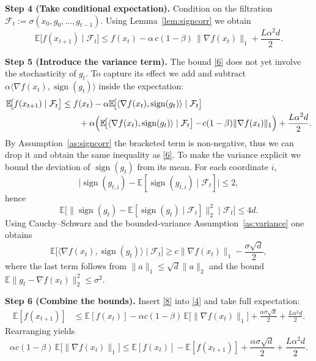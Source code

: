\documentclass{article}
\begin{document}
\noindent\textbf{Step 4 (Take conditional expectation).}  
Condition on the filtration $\mathcal{F}_{t}:=\sigma(x_{0},g_{0},\dots,g_{t-1})$.
Using Lemma~\ref{lem:signcorr} we obtain
\[
\mathbb{E}\!\bigl[f(x_{t+1})\mid\mathcal{F}_{t}\bigr]
\le f(x_{t})-\alpha\,c(1-\beta)\,\|\nabla f(x_{t})\|_{1}
+\frac{L\alpha^{2}d}{2}.
\tag{6}
\]

\noindent\textbf{Step 5 (Introduce the variance term).}  
The bound \eqref{6} does not yet involve the stochasticity of $g_{t}$. To capture its effect we add and subtract $\alpha\langle\nabla f(x_{t}),\operatorname{sign}(g_{t})\rangle$ inside the expectation:
\begin{align*}
\mathbb{E}\!\bigl[f(x_{t+1})\mid\mathcal{F}_{t}\bigr]
&\le f(x_{t})-\alpha\mathbb{E}\!\bigl[\langle\nabla f(x_{t}),\operatorname{sign}(g_{t})\rangle\mid\mathcal{F}_{t}\bigr]\\
&\qquad+\alpha\Bigl(\mathbb{E}\!\bigl[\langle\nabla f(x_{t}),\operatorname{sign}(g_{t})\rangle\mid\mathcal{F}_{t}\bigr]
-\!c(1-\beta)\|\nabla f(x_{t})\|_{1}\Bigr)
+\frac{L\alpha^{2}d}{2}.
\end{align*}
By Assumption~\ref{as:signcorr} the bracketed term is non‑negative, thus we can drop it and obtain the same inequality as \eqref{6}.  
To make the variance explicit we bound the deviation of $\operatorname{sign}(g_{t})$ from its mean. For each coordinate $i$,
\[
\bigl|\operatorname{sign}(g_{t,i})-\mathbb{E}[\operatorname{sign}(g_{t,i})\mid\mathcal{F}_{t}]\bigr|\le 2,
\]
hence
\[
\mathbb{E}\!\bigl[\|\operatorname{sign}(g_{t})-\mathbb{E}[\operatorname{sign}(g_{t})\mid\mathcal{F}_{t}]\|_{2}^{2}\mid\mathcal{F}_{t}\bigr]
\le 4d .
\tag{7}
\]
Using Cauchy–Schwarz and the bounded‑variance Assumption~\ref{as:variance} one obtains
\[
\mathbb{E}\!\bigl[\langle\nabla f(x_{t}),\operatorname{sign}(g_{t})\rangle\mid\mathcal{F}_{t}\bigr]
\ge c\|\nabla f(x_{t})\|_{1}
-\frac{\sigma\sqrt{d}}{2},
\tag{8}
\]
where the last term follows from $\|a\|_{1}\le\sqrt{d}\|a\|_{2}$ and the bound $\mathbb{E}\|g_{t}-\nabla f(x_{t})\|_{2}^{2}\le\sigma^{2}$.

\noindent\textbf{Step 6 (Combine the bounds).}  
Insert \eqref{8} into \eqref{4} and take full expectation:
\begin{align}
\mathbb{E}[f(x_{t+1})]
&\le \mathbb{E}[f(x_{t})]
-\alpha c(1-\beta)\,\mathbb{E}\bigl[\|\nabla f(x_{t})\|_{1}\bigr]
+\frac{\alpha\sigma\sqrt{d}}{2}
+\frac{L\alpha^{2}d}{2}.
\tag{9}
\end{align}
Rearranging yields
\[
\alpha c(1-\beta)\,\mathbb{E}\bigl[\|\nabla f(x_{t})\|_{1}\bigr]
\le \mathbb{E}[f(x_{t})]-\mathbb{E}[f(x_{t+1})]
+\frac{\alpha\sigma\sqrt{d}}{2}
+\frac{L\alpha^{2}d}{2}.
\tag{10}
\]
\end{document}
